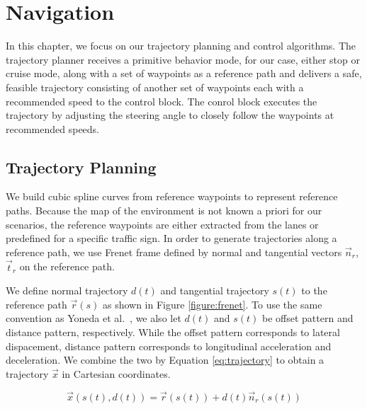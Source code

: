 \chapter{Navigation}
\label{chp:b5}

In this chapter, we focus on our trajectory planning and control algorithms.
The trajectory planner receives a primitive behavior mode, for our case, either
stop or cruise mode, along with a set of waypoints as a reference path and
delivers a safe, feasible trajectory consisting of another set of waypoints
each with a recommended speed to the control block. The conrol block executes
the trajectory by adjusting the steering angle to closely follow the waypoints
at recommended speeds.

\section{Trajectory Planning}

We build cubic spline curves from reference waypoints to represent reference
paths. Because the map of the environment is not known a priori for our
scenarios, the reference waypoints are either extracted from the lanes or
predefined for a specific traffic sign. In order to generate trajectories
along a reference path, we use Frenet frame \cite{Werling2010OptimalTG,
Yoneda2018TrajectoryOA} defined by normal and tangential vectors $\vec{n}_r$,
$\vec{t}_r$ on the reference path.

We define normal trajectory $d(t)$ and tangential trajectory $s(t)$ to the
reference path $\vec{r}(s)$ as shown in Figure \ref{figure:frenet}. To use the
same convention as Yoneda et al.\ \cite{Yoneda2018TrajectoryOA}, we also let
$d(t)$ and $s(t)$ be offset pattern and distance pattern, respectively. While
the offset pattern corresponds to lateral dispacement, distance pattern
corresponds to longitudinal acceleration and deceleration. We combine the two
by Equation \eqref{eq:trajectory} to obtain a trajectory $\vec{x}$ in Cartesian
coordinates.

\begin{equation}
  \vec{x}(s(t), d(t)) = \vec{r}(s(t)) + d(t)\vec{n}_r(s(t))
  \label{eq:trajectory}
\end{equation}

